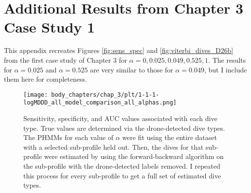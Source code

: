 \newpage

\section{Additional Results from Chapter 3 Case Study 1}

This appendix recreates Figures \ref{fig:sens_spec} and \ref{fig:viterbi_dives_D26b} from the first case study of Chapter 3 for $\alpha = 0,0.025,0.049,0.525,1$. The results for $\alpha = 0.025$ and $\alpha = 0.525$ are very similar to those for $\alpha = 0.049$, but I include them here for completeness.

\begin{figure}[H]
    \centering
    \texttt{[image: body\_chapters/chap\_3/plt/1-1-1-logMDDD\_all\_model\_comparison\_all\_alphas.png]}
    \caption[Sensitivity, specificity, and AUC values associated with each dive type from the first case study.]{Sensitivity, specificity, and AUC values associated with each dive type. True values are determined via the drone-detected dive types. The PHMMs for each value of $\alpha$ were fit using the entire dataset with a selected sub-profile held out. Then, the dives for that sub-profile were estimated by using the forward-backward algorithm on the sub-profile with the drone-detected labels removed. I repeated this process for every sub-profile to get a full set of estimated dive types.}
    \label{fig:sens_spec_app}
\end{figure}

